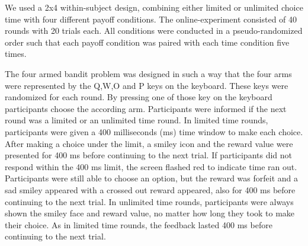 We used a 2x4 within-subject design, combining either limited or unlimited choice time with four different payoff conditions.
The online-experiment consisted of 40 rounds with 20 trials each. All conditions were conducted in a pseudo-randomized order such that each payoff condition was paired with each time condition five times.

The four armed bandit problem was designed in such a way that the four arms were represented by the Q,W,O and P keys on the keyboard. These keys were randomized for each round. By pressing one of those key on the keyboard participants choose the according arm. 
Participants were informed if the next round was a limited or an unlimited time round. In limited time rounds, participants were given a 400 milliseconds (ms) time window to make each choice. After making a choice under the limit, a smiley icon and the reward value were presented for 400 ms before continuing to the next trial. If participants did not respond within the 400 ms limit, the screen flashed red to indicate time ran out. Participants were still able to choose an option, but the reward was forfeit and a sad smiley appeared with a crossed out reward appeared, also for 400 ms before continuing to the next trial. In unlimited time rounds, participants were always shown the smiley face and reward value, no matter how long they took to make their choice. As in limited time rounds, the feedback lasted 400 ms before continuing to the next trial.

